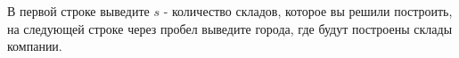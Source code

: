 В первой строке выведите $s$ - количество складов, которое вы решили построить, на следующей строке через пробел выведите города, где будут построены склады компании.